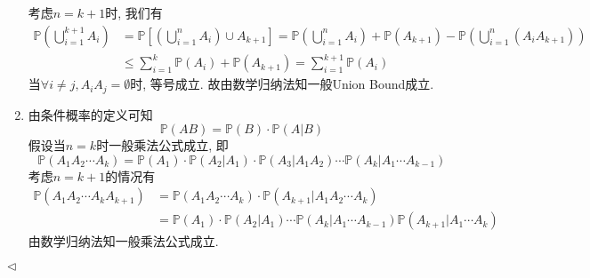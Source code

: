 \documentclass[11pt]{article}
\newenvironment{answer}[1][Solution]{\begin{trivlist}
\item[\hskip \labelsep {\bfseries #1.}\hskip \labelsep]}{\hfill$\lhd$\end{trivlist}}
\newcommand\1{\mathds{1}}
\newcommand\PP{\mathbb{P}}
\begin{document}
\begin{answer}
\begin{enumerate}[label = (\arabic*)]
    考虑$n = k+1$时, 我们有\begin{align*}
        \PP\left(\bigcup_{i=1}^{k+1} A_i\right) &= \PP\left[\left(\bigcup_{i=1}^n A_i\right) \cup A_{k+1}\right] = \PP\left(\bigcup_{i=1}^n A_i\right) + \PP(A_{k+1}) - \PP\left(\bigcup_{i=1}^n (A_iA_{k+1})\right) \\
        &\le \sum_{i=1}^{k}\PP(A_i) + \PP(A_{k+1}) = \sum_{i=1}^{k+1}\PP(A_i)
    \end{align*}
    当$\forall i \neq j, A_i A_j = \emptyset$时, 等号成立. 故由数学归纳法知一般Union Bound成立.
    \item 由条件概率的定义可知\[\PP(AB) = \PP(B) \cdot \PP(A|B)\]假设当$n = k$时一般乘法公式成立, 即\[\PP(A_1 A_2 \cdots A_k) = \PP(A_1)\cdot\PP(A_2|A_1)\cdot \PP(A_3|A_1 A_2) \cdots \PP(A_k|A_1\cdots A_{k-1})\]
    考虑$n=k+1$的情况有\begin{align*}
        \PP(A_1A_2\cdots A_k A_{k+1}) &= \PP(A_1A_2\cdots A_k) \cdot \PP(A_{k+1}|A_1A_2\cdots A_k) \\
        &= \PP(A_1)\cdot\PP(A_2|A_1)\cdots \PP(A_k|A_1\cdots A_{k-1}) \PP(A_{k+1}|A_1\cdots A_k)
    \end{align*}
    由数学归纳法知一般乘法公式成立.
\end{enumerate}
\end{answer}
\end{document}
